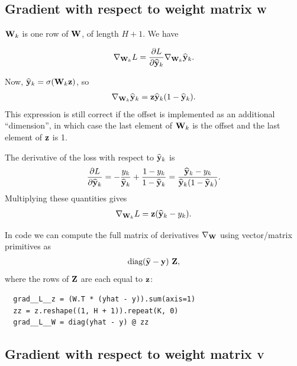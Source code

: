 \begin{mdframed}


\subsection{Gradient with respect to weight matrix $\mathbf W$}

$\mathbf W_k$ is one row of $\mathbf W$, of length $H+ 1$. We have

\begin{align*}
  \nabla_{\mathbf W_k} L = \frac{\partial L}{\partial \mathbf{\widehat{y}}_k}\nabla_{\mathbf W_k} \mathbf{\widehat{y}}_k.
\end{align*}

Now, $\mathbf{\widehat{y}}_k = \sigma(\mathbf W_k\mathbf z)$, so
\begin{align*}
  \nabla_{\mathbf W_k} \mathbf{\widehat{y}}_k = \mathbf z\mathbf{\widehat{y}}_k(1 - \mathbf{\widehat{y}}_k).
\end{align*}
This expression is still correct if the offset is implemented as an additional
``dimension'', in which case the last element of $\mathbf W_k$ is the offset and the
last element of $\mathbf z$ is 1.

The derivative of the loss with respect to $\mathbf{\widehat{y}}_k$ is
\begin{align*}
  \frac{\partial L}{\partial \mathbf{\widehat{y}}_k} =
  -\frac{y_k}{\mathbf{\widehat{y}}_k} + \frac{1 - y_k}{1 - \mathbf{\widehat{y}}_k} =
  \frac{\mathbf{\widehat{y}}_k - y_k}{\mathbf{\widehat{y}}_k(1 - \mathbf{\widehat{y}}_k)}.
\end{align*}
Multiplying these quantities gives
\begin{align*}
  \nabla_{\mathbf W_k} L = \mathbf z(\mathbf{\widehat{y}}_k - y_k).
\end{align*}

In code we can compute the full matrix of derivatives $\nabla_{\mathbf W}$ using
vector/matrix primitives as
\begin{align*}
  \operatorname{\text{diag}}(\mathbf{\mathbf{\widehat{y}}} - \mathbf y) ~ \mathbf Z,
\end{align*}
where the rows of $\mathbf Z$ are each equal to $\mathbf z$:

\begin{verbatim}
  grad__L__z = (W.T * (yhat - y)).sum(axis=1)
  zz = z.reshape((1, H + 1)).repeat(K, 0)
  grad__L__W = diag(yhat - y) @ zz
\end{verbatim}


\subsection{Gradient with respect to weight matrix $\mathbf V$}


\end{mdframed}
